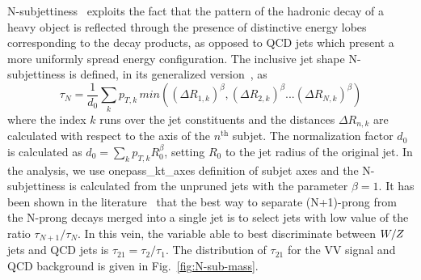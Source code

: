 N-subjettiness~\cite{Thaler:2010tr,Thaler:2011gf,Stewart:2010tn}
exploits the fact that the pattern of the hadronic decay of a heavy
object is reflected through the presence of distinctive energy lobes
corresponding to the decay products, as opposed to QCD jets which
present a more uniformly spread energy configuration. 
The inclusive jet shape N-subjettiness is
defined, in its generalized version~\cite{Thaler:2010tr}, as
%
\begin{equation}
\tau_N = \frac{1}{d_{0}} \sum_{k} p_{T,k}\,min( (\Delta R_{1,k})^{\beta}, (\Delta R_{2,k})^{\beta}...(\Delta R_{N,k})^{\beta})
\end{equation}
%
where the index $k$ runs over the jet constituents and the distances
$\Delta R_{n,k}$ are calculated with respect to the axis of the $n^{\mathrm{th}}$
subjet. The normalization factor $d_{0}$ is calculated as $d_{0}=
\sum_{k} p_{T,k}R^{\beta}_{0}$, setting $R_{0}$ to the jet radius of
the original jet. In the analysis, we use onepass\_kt\_axes definition
of subjet axes and the N-subjettiness is calculated
from the unpruned jets with the parameter $\beta=1$. 
It has been shown in the literature~\cite{Thaler:2010tr} that the
best way to separate (N+1)-prong from the N-prong decays merged into
a single jet is to select jets with low value of the ratio $\tau_{N+1}/\tau_N$.
In this vein, the variable able to best discriminate between $W/Z$ jets and QCD jets
is $\tau_{21}=\tau_{2} / \tau_{1}$. The distribution of $\tau_{21}$ for
the VV signal and QCD background is given in Fig.~\ref{fig:N-sub-mass}.

